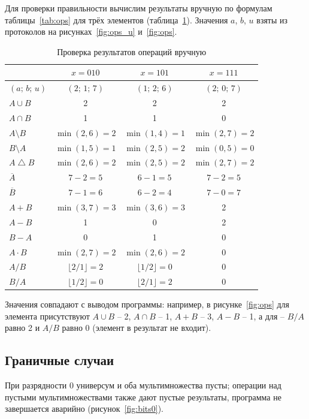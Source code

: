 \documentclass[14pt,a4paper]{extreport}
\newcommand{\code}[1]{{\ttfamily #1}}
\newcommand{\bigtri}{\mathbin{\triangle}}
\begin{document}
Для проверки правильности вычислим результаты вручную по формулам таблицы~\ref{tab:ops} для трёх элементов (таблица~\ref{tab:check}). Значения $a$, $b$, $u$ взяты из протоколов на рисунках~\ref{fig:ops_u} и~\ref{fig:ops}.

\begin{table}[H]
\caption{Проверка результатов операций вручную}\label{tab:check}
\centering\small\singlespacing
\begin{tabular}{lccc}
\toprule
 & $x=010$ & $x=101$ & $x=111$ \\
\midrule
$(a;\,b;\,u)$ & $(2;\,1;\,7)$ & $(1;\,2;\,6)$ & $(2;\,0;\,7)$ \\
$A\cup B$ & 2 & 2 & 2 \\
$A\cap B$ & 1 & 1 & 0 \\
$A\setminus B$ & $\min(2,6)=2$ & $\min(1,4)=1$ & $\min(2,7)=2$ \\
$B\setminus A$ & $\min(1,5)=1$ & $\min(2,5)=2$ & $\min(0,5)=0$ \\
$A\bigtri B$ & $\min(2,6)=2$ & $\min(2,5)=2$ & $\min(2,7)=2$ \\
$\overline{A}$ & $7-2=5$ & $6-1=5$ & $7-2=5$ \\
$\overline{B}$ & $7-1=6$ & $6-2=4$ & $7-0=7$ \\
$A+B$ & $\min(3,7)=3$ & $\min(3,6)=3$ & 2 \\
$A-B$ & 1 & 0 & 2 \\
$B-A$ & 0 & 1 & 0 \\
$A\cdot B$ & $\min(2,7)=2$ & $\min(2,6)=2$ & 0 \\
$A/B$ & $\lfloor 2/1\rfloor=2$ & $\lfloor 1/2\rfloor=0$ & 0 \\
$B/A$ & $\lfloor 1/2\rfloor=0$ & $\lfloor 2/1\rfloor=2$ & 0 \\
\bottomrule
\end{tabular}
\end{table}

Значения совпадают с выводом программы: например, в рисунке~\ref{fig:ops} для элемента \code{010} присутствуют $A\cup B$ -- 2, $A\cap B$ -- 1, $A+B$ -- 3, $A-B$ -- 1, а для \code{101} -- $B/A$ равно 2 и $A/B$ равно 0 (элемент в результат не входит).

\subsection{Граничные случаи}

При разрядности 0 универсум и оба мультимножества пусты; операции над пустыми мультимножествами также дают пустые результаты, программа не завершается аварийно (рисунок~\ref{fig:bits0}).
\end{document}
